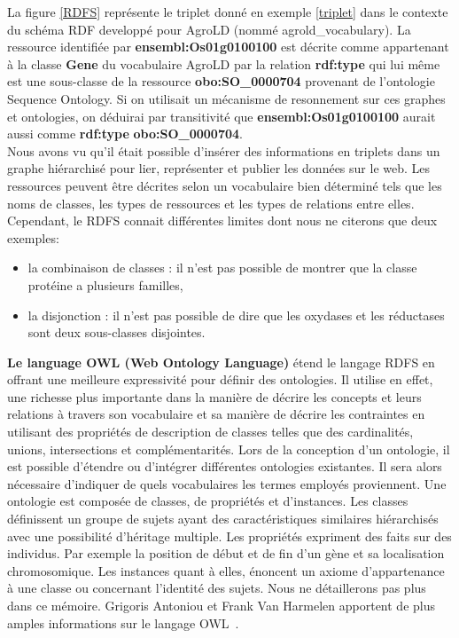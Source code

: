 La figure \ref{RDFS} représente le triplet donné en exemple \ref{triplet} dans le contexte du schéma RDF developpé pour AgroLD (nommé agrold\_vocabulary). La ressource identifiée par \textbf{ensembl:Os01g0100100} est décrite comme appartenant à la classe \textbf{Gene} du vocabulaire AgroLD par la relation \textbf{rdf:type} qui lui même est une sous-classe de la ressource \textbf{obo:SO\_0000704} provenant de l'ontologie Sequence Ontology. Si on utilisait un mécanisme de resonnement sur ces graphes et ontologies, on déduirai par transitivité que \textbf{ensembl:Os01g0100100} aurait aussi comme \textbf{rdf:type} \textbf{obo:SO\_0000704}.\\

Nous avons vu qu’il était possible d’insérer des informations en triplets dans un graphe hiérarchisé pour lier, représenter et publier les données sur le web. Les ressources peuvent être décrites selon un vocabulaire bien déterminé tels que les noms de classes, les types de ressources et les types de relations entre elles. Cependant, le RDFS connait différentes limites dont nous ne citerons que deux exemples:\\
\begin{itemize}
\item la combinaison de classes : il n’est pas possible de montrer que la classe protéine a plusieurs familles,
\item la disjonction : il n’est pas possible de dire que les oxydases et les réductases sont deux sous-classes disjointes.\\
\end{itemize}


\textbf{Le language OWL (Web Ontology Language)} étend le langage RDFS en offrant une meilleure expressivité pour définir des ontologies. Il utilise en effet, une richesse plus importante dans la manière de décrire les concepts et leurs relations à travers son vocabulaire et sa manière de décrire les contraintes en utilisant des propriétés de description de classes telles que des cardinalités, unions, intersections et complémentarités. Lors de la conception d’un ontologie, il est possible d'étendre ou d'intégrer différentes ontologies existantes. Il sera alors nécessaire d'indiquer de quels vocabulaires les termes employés proviennent. Une ontologie est composée de classes, de propriétés et d'instances. Les classes définissent un groupe de sujets ayant des caractéristiques similaires hiérarchisés avec une possibilité d'héritage multiple. Les propriétés expriment des faits sur des individus. Par exemple la position de début et de fin d'un gène et sa localisation chromosomique. Les instances quant à elles, énoncent un axiome d'appartenance à une classe ou concernant l'identité des sujets. Nous ne détaillerons pas plus dans ce mémoire. Grigoris Antoniou et Frank Van Harmelen apportent de plus amples informations sur le langage OWL~\cite{Antoniou2009a}.\\

